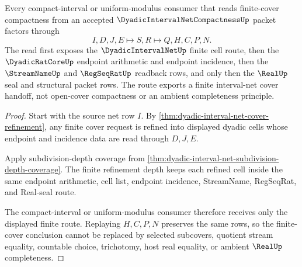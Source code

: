 \begin{theorem}
\label{thm:dyadic-interval-net-compactness-finite-cover-route}
Every compact-interval or uniform-modulus consumer that reads finite-cover compactness from an accepted $\DyadicIntervalNetCompactnessUp$ packet factors through
$$
I,D,J,E \longmapsto S,R \longmapsto Q,H,C,P,N .
$$
The read first exposes the $\DyadicIntervalNetUp$ finite cell route, then the $\DyadicRatCoreUp$ endpoint arithmetic and endpoint incidence, then the $\StreamNameUp$ and $\RegSeqRatUp$ readback rows, and only then the $\RealUp$ seal and structural packet rows. The route exports a finite interval-net cover handoff, not open-cover compactness or an ambient completeness principle.
\end{theorem}
\begin{proof}
Start with the source net row $I$. By \autoref{thm:dyadic-interval-net-cover-refinement}, any finite cover request is refined into displayed dyadic cells whose endpoint and incidence data are read through $D,J,E$.

Apply subdivision-depth coverage from \autoref{thm:dyadic-interval-net-subdivision-depth-coverage}. The finite refinement depth keeps each refined cell inside the same endpoint arithmetic, cell list, endpoint incidence, StreamName, RegSeqRat, and Real-seal route.

The compact-interval or uniform-modulus consumer therefore receives only the displayed finite route. Replaying $H,C,P,N$ preserves the same rows, so the finite-cover conclusion cannot be replaced by selected subcovers, quotient stream equality, countable choice, trichotomy, host real equality, or ambient $\RealUp$ completeness.
\end{proof}

